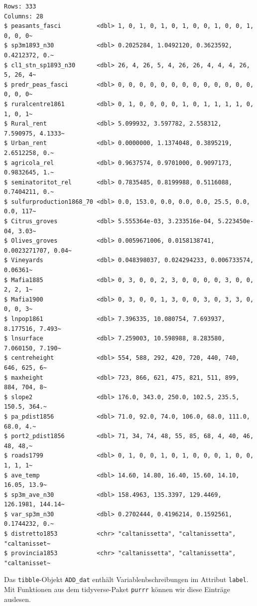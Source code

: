 \documentclass[
  a4paper,
  DIV=11,
  oneside]{scrreprt}
\begin{document}
\begin{verbatim}
Rows: 333
Columns: 28
$ peasants_fasci          <dbl> 1, 0, 1, 0, 1, 0, 1, 0, 0, 1, 0, 0, 1, 0, 0, 0~
$ sp3m1893_n30            <dbl> 0.2025284, 1.0492120, 0.3623592, 0.4212372, 0.~
$ cl1_stn_sp1893_n30      <dbl> 26, 4, 26, 5, 4, 26, 26, 4, 4, 4, 26, 5, 26, 4~
$ predr_peas_fasci        <dbl> 0, 0, 0, 0, 0, 0, 0, 0, 0, 0, 0, 0, 0, 0, 0, 0~
$ ruralcentre1861         <dbl> 0, 1, 0, 0, 0, 0, 1, 0, 1, 1, 1, 1, 0, 1, 0, 1~
$ Rural_rent              <dbl> 5.099932, 3.597782, 2.558312, 7.590975, 4.1333~
$ Urban_rent              <dbl> 0.0000000, 1.1374048, 0.3895219, 2.6512258, 0.~
$ agricola_rel            <dbl> 0.9637574, 0.9701000, 0.9097173, 0.9832645, 1.~
$ seminatoritot_rel       <dbl> 0.7835485, 0.8199988, 0.5116088, 0.7404211, 0.~
$ sulfurproduction1868_70 <dbl> 0.0, 153.0, 0.0, 0.0, 0.0, 25.5, 0.0, 0.0, 117~
$ Citrus_groves           <dbl> 5.555364e-03, 3.233516e-04, 5.223450e-04, 3.03~
$ Olives_groves           <dbl> 0.0059671006, 0.0158138741, 0.0023271707, 0.04~
$ Vineyards               <dbl> 0.048398037, 0.024294233, 0.006733574, 0.06361~
$ Mafia1885               <dbl> 0, 3, 0, 0, 2, 3, 0, 0, 0, 0, 3, 0, 0, 2, 2, 1~
$ Mafia1900               <dbl> 0, 3, 0, 0, 1, 3, 0, 0, 3, 0, 3, 3, 0, 0, 0, 3~
$ lnpop1861               <dbl> 7.396335, 10.080754, 7.693937, 8.177516, 7.493~
$ lnsurface               <dbl> 7.259003, 10.598988, 8.283580, 7.060150, 7.190~
$ centreheight            <dbl> 554, 588, 292, 420, 720, 440, 740, 646, 625, 6~
$ maxheight               <dbl> 723, 866, 621, 475, 821, 511, 899, 884, 704, 8~
$ slope2                  <dbl> 176.0, 343.0, 250.0, 102.5, 235.5, 150.5, 364.~
$ pa_pdist1856            <dbl> 71.0, 92.0, 74.0, 106.0, 68.0, 111.0, 68.0, 4.~
$ port2_pdist1856         <dbl> 71, 34, 74, 48, 55, 85, 68, 4, 40, 46, 48, 48,~
$ roads1799               <dbl> 0, 1, 0, 0, 1, 0, 1, 0, 0, 0, 1, 0, 0, 1, 1, 1~
$ ave_temp                <dbl> 14.60, 14.80, 16.40, 15.60, 14.10, 16.05, 13.9~
$ sp3m_ave_n30            <dbl> 158.4963, 135.3397, 129.4469, 126.1981, 144.14~
$ var_sp3m_n30            <dbl> 0.2702444, 0.4196214, 0.1592561, 0.1744232, 0.~
$ distretto1853           <chr> "caltanissetta", "caltanissetta", "caltanisset~
$ provincia1853           <chr> "caltanissetta", "caltanissetta", "caltanisset~
\end{verbatim}

Das \texttt{tibble}-Objekt \texttt{ADD\_dat} enthält
Variablenbschreibungen im Attribut \texttt{label}. Mit Funktionen aus
dem tidyverse-Paket \texttt{purrr} können wir diese Einträge auslesen.
\end{document}
